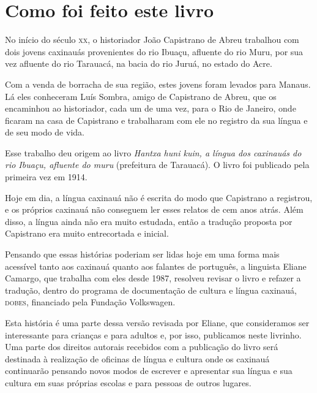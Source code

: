 \chapter{Como foi feito este livro}

No início do século \textsc{xx}, o historiador João Capistrano de Abreu trabalhou
com dois jovens caxinauás provenientes do rio Ibuaçu, afluente do rio Muru, por sua vez afluente do rio Tarauacá, na bacia do rio Juruá, no estado do Acre.

Com a venda de borracha de sua região, estes jovens foram levados para Manaus. Lá eles conheceram Luís Sombra, amigo de Capistrano de Abreu, que os encaminhou ao historiador, cada um de uma vez, para o Rio de Janeiro, onde ficaram na casa de Capistrano e trabalharam
com ele no registro da sua língua e de seu modo de vida.

Esse trabalho deu origem ao livro \textit{Hantxa huni kuin, a língua dos caxinauás do rio Ibuaçu, afluente do muru} (prefeitura de Tarauacá). O livro foi publicado pela primeira vez em 1914.

Hoje em dia, a língua caxinauá não é escrita do modo que Capistrano a
registrou, e os próprios caxinauá não conseguem ler esses relatos de
cem anos atrás. Além disso, a língua ainda não era muito estudada, então
a tradução proposta por Capistrano era muito entrecortada e inicial.


Pensando que essas histórias poderiam ser lidas hoje em uma forma mais acessível tanto aos caxinauá quanto aos falantes de português, a linguista Eliane Camargo, que
trabalha com eles desde 1987, resolveu revisar o livro e refazer a tradução, dentro do programa de documentação de cultura e língua caxinauá, \textsc{dobes}, financiado pela
Fundação Volkswagen.

Esta história é uma parte dessa versão revisada por Eliane, que consideramos ser interessante para crianças e para adultos e, por isso, publicamos neste livrinho. Uma parte
dos direitos autorais recebidos com a publicação do livro será destinada à realização de oficinas de língua e cultura onde os caxinauá continuarão pensando novos modos de
escrever e apresentar sua língua e sua cultura em suas próprias escolas e para pessoas de outros lugares.



